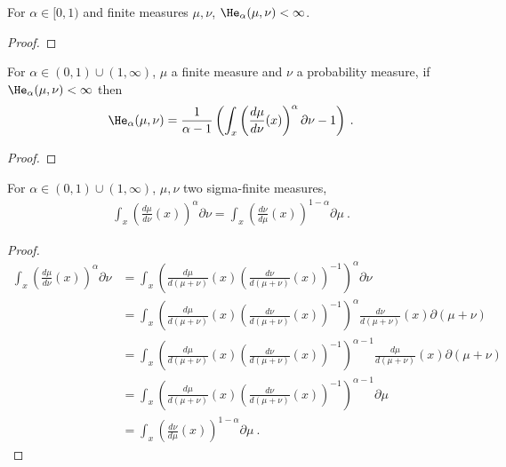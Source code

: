 \begin{lemma}
  \label{lem:hellingerAlpha_ne_top_of_lt_one}
  \leanok
  For $\alpha \in [0, 1)$ and finite measures $\mu, \nu$, $\He_\alpha(\mu, \nu) < \infty$.
\end{lemma}

\begin{proof}\leanok
\uses{}
\end{proof}


\begin{lemma}
  \label{lem:hellingerAlpha_eq_integral}
  For $\alpha \in (0,1)\cup(1, \infty)$, $\mu$ a finite measure and $\nu$ a probability measure, if $\He_\alpha(\mu, \nu) < \infty$ then
  \begin{align*}
  \He_\alpha(\mu, \nu) = \frac{1}{\alpha - 1} \left( \int_x \left(\frac{d \mu}{d \nu}(x)\right)^\alpha \partial \nu - 1 \right)
  \: .
  \end{align*}
\end{lemma}

\begin{proof}%
\uses{}
\end{proof}


\begin{lemma}
  \label{lem:integral_rpow_rnDeriv_symm}
  \leanok
  \uses{}
  For $\alpha \in (0,1)\cup(1, \infty)$, $\mu, \nu$ two sigma-finite measures,
  \begin{align*}
  \int_x \left(\frac{d \mu}{d \nu}(x)\right)^\alpha \partial \nu
  = \int_x \left(\frac{d \nu}{d \mu}(x)\right)^{1 - \alpha} \partial \mu
  \: .
  \end{align*}
\end{lemma}

\begin{proof}\leanok
\uses{}
\begin{align*}
  \int_x \left(\frac{d \mu}{d \nu}(x)\right)^\alpha \partial \nu
  &= \int_x \left(\frac{d \mu}{d (\mu + \nu)}(x) \left(\frac{d \nu}{d (\mu + \nu)}(x)\right)^{-1} \right)^\alpha \partial \nu \\
  &= \int_x \left(\frac{d \mu}{d (\mu + \nu)}(x) \left(\frac{d \nu}{d (\mu + \nu)}(x)\right)^{-1} \right)^\alpha \frac{d \nu}{d (\mu + \nu)}(x) \partial (\mu + \nu) \\
  &= \int_x \left(\frac{d \mu}{d (\mu + \nu)}(x) \left(\frac{d \nu}{d (\mu + \nu)}(x)\right)^{-1} \right)^{\alpha - 1} \frac{d \mu}{d (\mu + \nu)}(x) \partial (\mu + \nu) \\
  &= \int_x \left(\frac{d \mu}{d (\mu + \nu)}(x) \left(\frac{d \nu}{d (\mu + \nu)}(x)\right)^{-1} \right)^{\alpha - 1} \partial \mu \\
  &= \int_x \left(\frac{d \nu}{d \mu}(x)\right)^{1 - \alpha} \partial \mu
  \: .
  \end{align*}
\end{proof}


